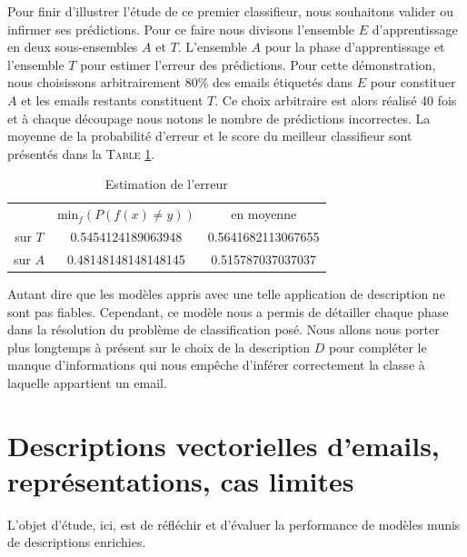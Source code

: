 \documentclass[a4paper, french]{article}
\begin{document}
Pour finir d'illustrer l'\'etude de ce premier classifieur, nous souhaitons
valider ou infirmer ses pr\'edictions. Pour ce faire nous divisons
l'ensemble $E$ d'apprentissage en deux sous-ensembles $A$ et $T$. 
L'ensemble $A$ pour la phase d'apprentissage et l'ensemble $T$ pour 
estimer l'erreur des pr\'edictions. Pour cette d\'emonstration, 
nous choisissons arbitrairement $80\%$ des emails \'etiquet\'es dans $E$ 
pour constituer $A$ et les emails restants constituent $T$. Ce choix arbitraire
est alors r\'ealis\'e 40 fois et \`a chaque d\'ecoupage nous notons le nombre
de pr\'edictions incorrectes. La moyenne de la probabilit\'e d'erreur et
le score du meilleur classifieur sont pr\'esent\'es dans la T\textsc{able}
\ref{tbl:erreur_exo2}.

\begin{table}[h]
\begin{center}
    \caption{Estimation de l'erreur}
    \label{tbl:erreur_exo2}
    \vskip 4mm
    \begin{tabular}{ccc}
        &min$_f(P(f(x)\neq y))$&en moyenne\\
        sur $T$&0.5454124189063948&0.5641682113067655\\
        sur $A$&0.48148148148148145&0.515787037037037
    \end{tabular}
\end{center}
\end{table}

Autant dire que les mod\`eles appris avec une telle application de description
ne sont pas fiables. Cependant, ce mod\`ele nous a permis de d\'etailler chaque
phase dans la r\'esolution du probl\`eme de classification pos\'e. Nous allons
nous porter plus longtemps \`a pr\'esent sur le choix de la description $D$
pour compl\'eter le manque d'informations qui nous emp\^eche 
d'inf\'erer correctement la classe \`a laquelle appartient un email.


\section{Descriptions vectorielles d'emails, repr\'esentations, cas limites}

L'objet d'\'etude, ici, est de r\'efl\'echir et d'\'evaluer la performance 
de mod\`eles munis de descriptions enrichies.
\end{document}
